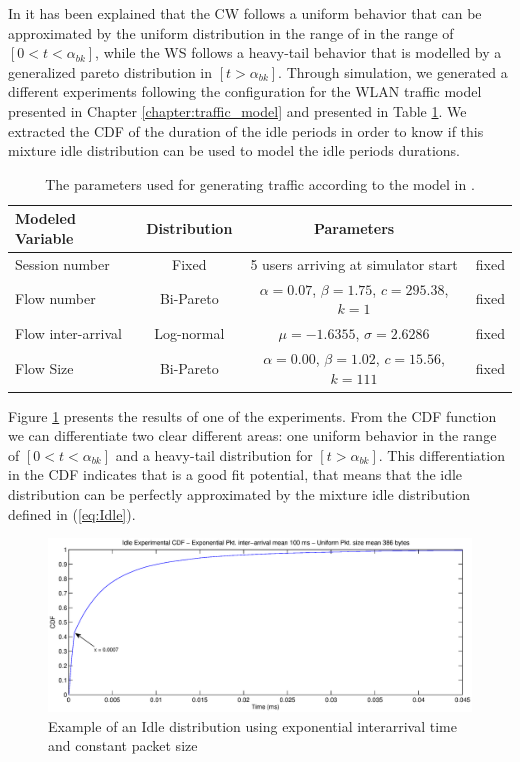 In \cite{DSA-Emp} it has been explained that the \acs{CW} follows a uniform behavior that can be approximated by the uniform distribution in the range of in the range of $[0 < t < \alpha_{bk}]$, while the \acs{WS} follows a heavy-tail behavior that is modelled by a generalized pareto distribution in $[t > \alpha_{bk}]$.  Through simulation, we generated a different experiments following the configuration for the \acs{WLAN} traffic model presented in Chapter \ref{chapter:traffic_model} and presented in Table \ref{table:traffic_sensitivity}. We extracted the \acs{CDF} of the duration of the idle periods in order to know if this mixture idle distribution can be used to model the idle periods durations. 

\begin{table}[h!]
	\begin{center}
		\begin{tabular}{ l | c | c c }
			Modeled Variable & Distribution & Parameters & \\ \hline
			Session number	& Fixed & 5 users arriving at simulator start & fixed\\
			Flow number & Bi-Pareto & $\alpha = 0.07$, $\beta = 1.75$, $c = 295.38$, $k = 1$ & fixed\\
			Flow inter-arrival & Log-normal & $\mu = -1.6355$, $\sigma = 2.6286$ & fixed\\
			Flow Size & Bi-Pareto & $\alpha = 0.00$, $\beta = 1.02$, $c = 15.56$, $k = 111$ & fixed\\
		\end{tabular}
		\caption{The parameters used for generating traffic according to the model in \cite{Campus-WLAN}.}
		\label{table:traffic_sensitivity}
	\end{center}
\end{table}

Figure \ref{fig:cdf_globalview} presents the results of one of the experiments. From the \acs{CDF} function we can differentiate two clear different areas: one uniform behavior in the range of $[0 < t < \alpha_{bk}]$ and a heavy-tail distribution for $[t > \alpha_{bk}]$. This differentiation in the \acs{CDF} indicates that is a good fit potential, that means that the idle distribution can be perfectly approximated by the mixture idle distribution defined in (\ref{eq:Idle}).

\begin{figure}[h!]
	\centering
	\includegraphics[width=\textwidth, trim = 0mm 0mm 0mm 0mm, clip]{images/results/GlobalView/cdf_globalview}
	\caption{Example of an Idle distribution using exponential interarrival time and constant packet size}
	\label{fig:cdf_globalview}
\end{figure}

